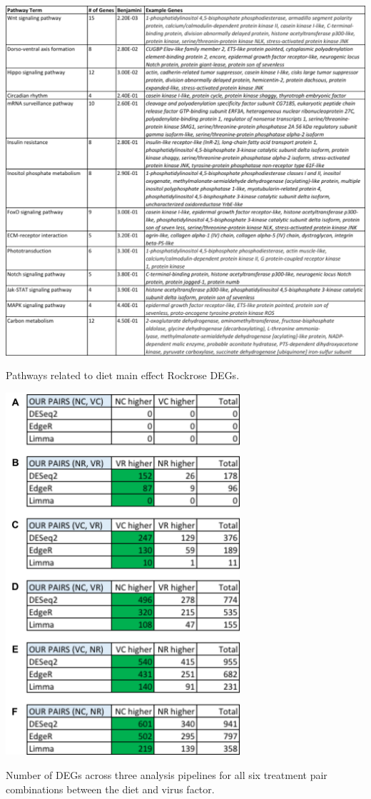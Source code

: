 \documentclass[11pt,a4paper,oldfontcommands,openany]{memoir}
\numberwithin{equation}{section} %
\begin{document}
\begin{table}[H]
  \includegraphics[width=\textwidth]{Images/CastaneaPathways}
  \caption{Pathways related to diet main effect Rockrose DEGs.}
  \label{tbl:RockrosePathways}
\end{table}

\begin{table}[H]
  \includegraphics[width=0.65\textwidth]{Images/pairDEGs}
  \caption{Number of DEGs across three analysis pipelines for all six treatment pair combinations between the diet and virus factor.}
  \label{tbl:pairDEGs}
\end{table}
\end{document}
